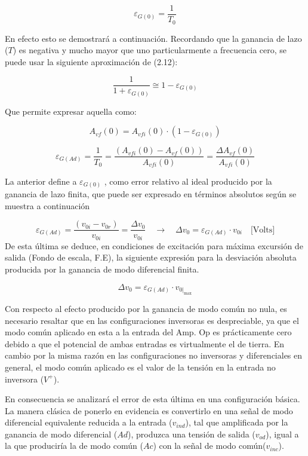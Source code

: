 \begin{equation} \tag{2.13}
\varepsilon_{G(0)} = \frac{1}{T_0}
\end{equation}

En efecto esto se demostrará a continuación. Recordando que la ganancia de lazo ($T$) es negativa y mucho mayor que uno particularmente a frecuencia cero, se puede usar la siguiente aproximación de (2.12):

\begin{equation} \tag{2.14}
\frac{1}{1 + \varepsilon_{G(0)}} \cong 1 - \varepsilon_{G(0)}
\end{equation}

Que permite expresar aquella como:

\[
A_{vf}(0) = A_{vfi}(0) \cdot (1 - \varepsilon_{G(0)})
\]

\[
\varepsilon_{G(Ad)} = \frac{1}{T_0} = \frac{(A_{vfi}(0) - A_{vf}(0))}{A_{vfi}(0)} = \frac{\Delta A_{vf}(0)}{A_{vfi}(0)}
\]

La anterior define a $\varepsilon_{G(0)}$ , como error relativo al ideal producido por la ganancia de lazo finita, que puede ser expresado en términos absolutos según se muestra a continuación

\begin{equation} \tag{2.15}
\varepsilon_{G(Ad)} = \frac{(v_{0i} - v_{0r})}{v_{0i}} = \frac{\Delta v_0}{v_{0i}} \quad \rightarrow \quad \Delta v_0 = \varepsilon_{G(Ad)} \cdot v_{0i} \quad \text{[Volts]}
\end{equation}
\noindent De esta última se deduce, en condiciones de excitación para máxima excursión de salida (Fondo de escala, F.E), la siguiente expresión para la desviación absoluta producida por la ganancia de modo diferencial finita.

\begin{equation} \tag{2.16}
\Delta v_0 = \varepsilon_{G(Ad)} \cdot v_{0|_{\max}}
\end{equation}

Con respecto al efecto producido por la ganancia de modo común no nula, es necesario resaltar que en las configuraciones inversoras es despreciable, ya que el modo común aplicado en esta a la entrada del Amp. Op es prácticamente cero debido a que el potencial de ambas entradas es virtualmente el de tierra. En cambio por la misma razón en las configuraciones no inversoras y diferenciales en general, el modo común aplicado es el valor de la tensión en la entrada no inversora ($V^+$).

En consecuencia se analizará el error de esta última en una configuración básica. La manera clásica de ponerlo en evidencia es convertirlo en una señal de modo diferencial equivalente reducida a la entrada ($v_{ind}$), tal que amplificada por la ganancia de modo diferencial ($Ad$), produzca una tensión de salida ($v_{od}$), igual a la que produciría la de modo común ($Ac$) con la señal de modo común($v_{inc}$).

